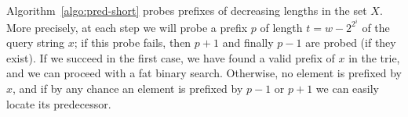 \documentclass[a4paper,11pt]{article}
\newcommand{\?}{\mskip1.5mu}
\def\..{\,\mathpunct{\ldotp\ldotp}} %
\DeclareMathOperator{\lrange}{left}
\DeclareMathOperator{\rrange}{right}
\DeclareMathOperator{\extent}{extent}
\DeclareMathOperator{\pred}{pred}
\DeclareMathOperator{\fbs}{FBS}
\begin{document}
Algorithm~\ref{algo:pred-short} probes prefixes of decreasing lengths in the set
$X$. More precisely, at each step we will probe a prefix $p$ of length $t =
w-2^{2^i}$ of the query string $x$; if this probe fails, then $p+1$ and finally
$p-1$ are probed (if they exist). If we succeed in the first case, we have found
a valid prefix of $x$ in the trie, and we can proceed with a fat binary search.
Otherwise, no element is prefixed by $x$, and if by any chance an element is prefixed by $p-1$ or $p+1$ we can easily
locate its predecessor.
 

\end{document}
